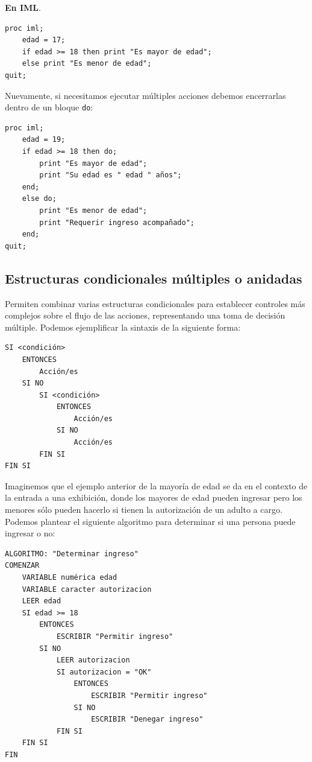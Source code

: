 \documentclass[]{book}
\begin{document}
\textbf{En IML}.

\begin{verbatim}
proc iml;
    edad = 17;
    if edad >= 18 then print "Es mayor de edad";
    else print "Es menor de edad";
quit;
\end{verbatim}

Nuevamente, si necesitamos ejecutar múltiples acciones debemos encerrarlas dentro de un bloque \texttt{do}:

\begin{verbatim}
proc iml;
    edad = 19;
    if edad >= 18 then do;
        print "Es mayor de edad";
        print "Su edad es " edad " años";
    end;
    else do;
        print "Es menor de edad";
        print "Requerir ingreso acompañado";
    end;
quit;
\end{verbatim}

\hypertarget{estructuras-condicionales-multiples-o-anidadas}{%
\subsection{Estructuras condicionales múltiples o anidadas}\label{estructuras-condicionales-multiples-o-anidadas}}

Permiten combinar varias estructuras condicionales para establecer controles más complejos sobre el flujo de las acciones, representando una toma de decisión múltiple. Podemos ejemplificar la sintaxis de la siguiente forma:

\begin{verbatim}
SI <condición> 
    ENTONCES
        Acción/es
    SI NO
        SI <condición> 
            ENTONCES
                Acción/es
            SI NO
                Acción/es
        FIN SI
FIN SI
\end{verbatim}

Imaginemos que el ejemplo anterior de la mayoría de edad se da en el contexto de la entrada a una exhibición, donde los mayores de edad pueden ingresar pero los menores sólo pueden hacerlo si tienen la autorización de un adulto a cargo. Podemos plantear el siguiente algoritmo para determinar si una persona puede ingresar o no:

\begin{verbatim}
ALGORITMO: "Determinar ingreso"
COMENZAR
    VARIABLE numérica edad
    VARIABLE caracter autorizacion
    LEER edad
    SI edad >= 18 
        ENTONCES
            ESCRIBIR "Permitir ingreso"
        SI NO
            LEER autorizacion
            SI autorizacion = "OK" 
                ENTONCES
                    ESCRIBIR "Permitir ingreso"
                SI NO
                    ESCRIBIR "Denegar ingreso"
            FIN SI
    FIN SI
FIN
\end{verbatim}
\end{document}

